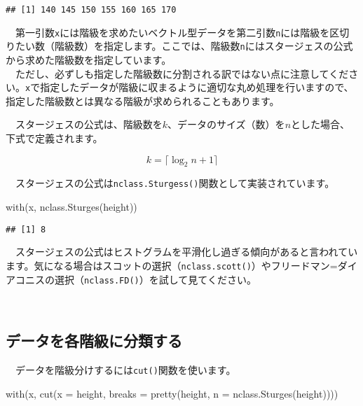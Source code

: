 \documentclass[
  12pt,
]{book}
\newenvironment{Shaded}{\begin{snugshade}}{\end{snugshade}}
\newcommand{\AttributeTok}[1]{\textcolor[rgb]{0.77,0.63,0.00}{#1}}
\newcommand{\FunctionTok}[1]{\textcolor[rgb]{0.00,0.00,0.00}{#1}}
\newcommand{\NormalTok}[1]{#1}
\begin{document}
\begin{verbatim}
## [1] 140 145 150 155 160 165 170
\end{verbatim}

　第一引数\texttt{x}には階級を求めたいベクトル型データを第二引数\texttt{n}には階級を区切りたい数（階級数）を指定します。ここでは、階級数\texttt{n}にはスタージェスの公式から求めた階級数を指定しています。\\
　ただし、必ずしも指定した階級数に分割される訳ではない点に注意してください。\texttt{x}で指定したデータが階級に収まるように適切な丸め処理を行いますので、指定した階級数とは異なる階級が求められることもあります。

　スタージェスの公式は、階級数を\(k\)、データのサイズ（数）を\(n\)とした場合、下式で定義されます。

\[k = \lceil \log_2n + 1 \rceil\]

　スタージェスの公式は\texttt{nclass.Sturgess()}関数として実装されています。

\begin{Shaded}
\begin{Highlighting}[]
\FunctionTok{with}\NormalTok{(x, }\FunctionTok{nclass.Sturges}\NormalTok{(height))}
\end{Highlighting}
\end{Shaded}

\begin{verbatim}
## [1] 8
\end{verbatim}

　スタージェスの公式はヒストグラムを平滑化し過ぎる傾向があると言われています。気になる場合はスコットの選択（\texttt{nclass.scott()}）やフリードマン=ダイアコニスの選択（\texttt{nclass.FD()}）を試して見てください。

　

\hypertarget{ux30c7ux30fcux30bfux3092ux5404ux968eux7d1aux306bux5206ux985eux3059ux308b}{%
\subsection{データを各階級に分類する}\label{ux30c7ux30fcux30bfux3092ux5404ux968eux7d1aux306bux5206ux985eux3059ux308b}}

　データを階級分けするには\texttt{cut()}関数を使います。

\begin{Shaded}
\begin{Highlighting}[]
\FunctionTok{with}\NormalTok{(x, }\FunctionTok{cut}\NormalTok{(}\AttributeTok{x =}\NormalTok{ height, }\AttributeTok{breaks =} \FunctionTok{pretty}\NormalTok{(height, }\AttributeTok{n =} \FunctionTok{nclass.Sturges}\NormalTok{(height))))}
\end{Highlighting}
\end{Shaded}
\end{document}
